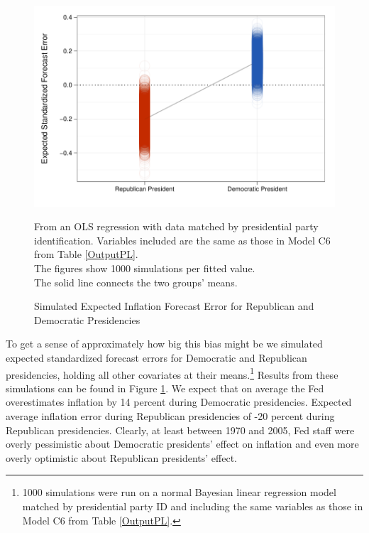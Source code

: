 \documentclass[a4paper]{article}\usepackage{graphicx, color}
\newenvironment{knitrout}{}{} %
\begin{document}
\begin{figure}[t]
    \caption{Simulated Expected Inflation Forecast Error for Republican and Democratic Presidencies}
    \label{ExpectValueParty}
    \begin{center}

\begin{knitrout}
\color{fgcolor}\includegraphics[width=0.7\linewidth]{figure/ExpectValueParty} 
\end{knitrout}

    \end{center}
    \begin{singlespace}
        {\scriptsize{From an OLS regression with data matched by presidential party identification. Variables included are the same as those in Model C6 from Table \ref{OutputPL}. \\ The figures show 1000 simulations per fitted value. \\ The solid line connects the two groups' means.}}
    \end{singlespace}
\end{figure}

To get a sense of approximately how big this bias might be we simulated expected standardized forecast errors for Democratic and Republican presidencies, holding all other covariates at their means.\footnote{1000 simulations were run on a normal Bayesian linear regression model matched by presidential party ID and including the same variables as those in Model C6 from Table \ref{OutputPL}.} Results from these simulations can be found in Figure \ref{ExpectValueParty}. We expect that on average the Fed overestimates inflation by 14 percent during Democratic presidencies. Expected average inflation error during Republican presidencies of -20 percent during Republican presidencies. Clearly, at least between 1970 and 2005, Fed staff were overly pessimistic about Democratic presidents' effect on inflation and even more overly optimistic about Republican presidents' effect. 
\end{document}
